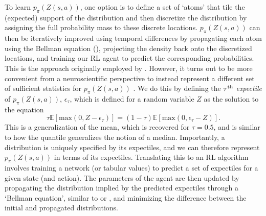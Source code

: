 To learn $p_\pi(Z(s, a))$, one option is to define a set of `atoms' that tile the (expected) support of the distribution and then discretize the distribution by assigning the full probability mass to these discrete locations.
$p_\pi(Z(s, a))$ can then be iteratively improved using temporal differences by propagating each atom using the Bellman equation (), projecting the density back onto the discretized locations, and training our RL agent to predict the corresponding probabilities.
This is the approach originally employed by \citet{bellemare2017distributional}.
However, it turns out to be more convenient from a neuroscientific perspective to instead represent a different set of sufficient statistics for $p_\pi(Z(s, a))$ \citep{dabney2020distributional,lowet2020distributional}.
We do this by defining the $\tau\textsuperscript{th}$ \emph{expectile} of $p_\pi(Z(s, a))$, $\epsilon_\tau$, which is defined for a random variable $Z$ as the solution to the equation
\begin{equation}
    \tau \mathbb{E} [\text{max}(0, Z - \epsilon_\tau)] = (1-\tau) \mathbb{E} [\text{max}(0, \epsilon_\tau - Z)].
\end{equation}
This is a generalization of the mean, which is recovered for $\tau = 0.5$, and is similar to how the quantile generalizes the notion of a median.
Importantly, a distribution is uniquely specified by its expectiles, and we can therefore represent $p_\pi(Z(s, a))$ in terms of its expectiles.
Translating this to an RL algorithm involves training a network (or tabular values) to predict a set of expectiles for a given state (and action).
The parameters of the agent are then updated by propagating the distribution implied by the predicted expectiles through a `Bellman equation', similar to  or , and minimizing the difference between the initial and propagated distributions.


